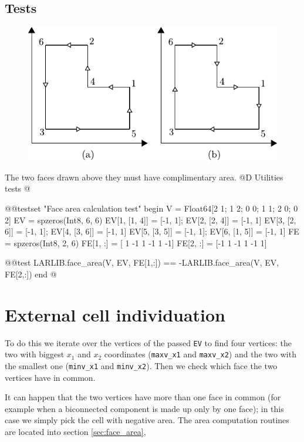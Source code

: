 \subsection{Tests}
\begin{figure}[h]
    \centering
    \includegraphics{./img/ch5-area_test.pdf}
\end{figure}
\noindent The two faces drawn above they must have complimentary area.
@D Utilities tests
@{@@testset "Face area calculation test" begin
    V = Float64[2 1; 1 2; 0 0; 1 1; 2 0; 0 2]
    EV = spzeros(Int8, 6, 6)
    EV[1, [1, 4]] = [-1, 1]; EV[2, [2, 4]] = [-1, 1]
    EV[3, [2, 6]] = [-1, 1]; EV[4, [3, 6]] = [-1, 1]
    EV[5, [3, 5]] = [-1, 1]; EV[6, [1, 5]] = [-1, 1]
    FE = spzeros(Int8, 2, 6)
    FE[1, :] = [ 1 -1  1 -1  1 -1]
    FE[2, :] = [-1  1 -1  1 -1  1]

    @@test LARLIB.face_area(V, EV, FE[1,:]) == -LARLIB.face_area(V, EV, FE[2,:])
end
@}

\section{External cell individuation}
\label{sec:external_cell}
To do this we iterate over the
vertices of the passed \texttt{EV} to find four vertices: the two with biggest
$x_1$ and $x_2$ coordinates (\texttt{maxv\_x1} and \texttt{maxv\_x2}) and the 
two with the smallest one (\texttt{minv\_x1} and \texttt{minv\_x2}). 
Then we check which face the two vertices have in common. 

It can happen that the two vertices have more than one face in common
(for example when a biconnected component is made up only by one face);
in this case we simply pick the cell with negative area. The area
computation routines are located into section \ref{sec:face_area},


